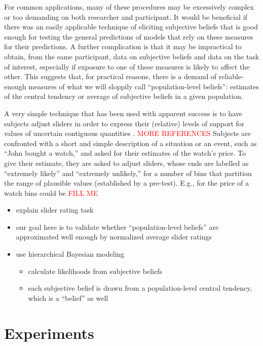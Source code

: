 \documentclass[10pt,letterpaper]{article}
\newcommand{\citep}[1]{\cite{#1}}
\begin{document}
For common applications, many of these procedures may be excessively complex or too demanding
on both researcher and participant. It would be beneficial if there was an easily applicable
technique of eliciting subjective beliefs that is good enough for testing the general
predictions of models that rely on these measures for their predictions. A further complication
is that it may be impractical to obtain, from the same participant, data on subjective beliefs
and data on the task of interest, especially if exposure to one of these measures is likely to
affect the other. This suggests that, for practical reasons, there is a demand of
reliable-enough measures of what we will sloppily call ``population-level beliefs'': estimates
of the central tendency or average of subjective beliefs in a given population.

A very simple technique that has been used with apparent success is to have subjects adjust
sliders in order to express their (relative) levels of support for values of uncertain
contiguous quantities
\citep{KaoWu2014:Nonliteral-Unde,SchollerFranke2015:Semantic-values}. \textcolor{red}{ MORE REFERENCES } Subjects are confronted with a short and simple description of a situation or an
event, such as ``John bought a watch,'' and asked for their estimates of the watch's price. To
give their estimate, they are asked to adjust sliders, whose ends are labelled as ``extremely
likely'' and ``extremely unlikely,'' for a number of bins that partition the range of plausible
values (established by a pre-test). E.g., for the price of a watch bins could be
\textcolor{red}{ FILL ME }

\begin{itemize}
\item explain slider rating task
\item our goal here is to validate whether ``population-level beliefs'' are approximated well
  enough by normalized average slider ratings
\item use hierarchical Bayesian modeling
  \begin{itemize}
  \item calculate likelihoods from subjective beliefs
  \item each subjective belief is drawn from a population-level central tendency, which is a
    ``belief'' as well
  \end{itemize}
\end{itemize}

\section{Experiments}
\end{document}
